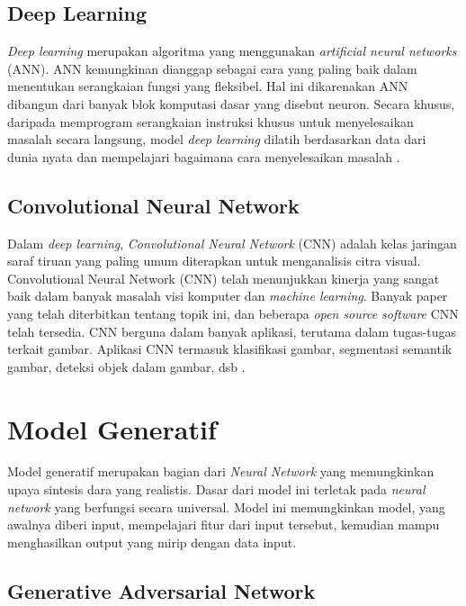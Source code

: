 \subsection{Deep Learning}
\label{subsesc:deeplearning}
\emph{Deep learning} merupakan algoritma yang menggunakan \emph{artificial neural networks} (ANN). 
ANN kemungkinan dianggap sebagai cara yang paling baik dalam menentukan serangkaian fungsi yang fleksibel. 
Hal ini dikarenakan ANN dibangun dari banyak blok komputasi dasar yang disebut neuron. 
Secara khusus, daripada memprogram serangkaian instruksi khusus untuk menyelesaikan masalah secara langsung, model \emph{deep learning} dilatih berdasarkan data dari dunia nyata dan mempelajari bagaimana cara menyelesaikan masalah \parencite{PDLT-2022}. 

\subsection{Convolutional Neural Network}
\label{subsec:convolutionalNeuralNetwork}

Dalam \emph{deep learning}, \emph{Convolutional Neural Network} (CNN) adalah kelas jaringan saraf tiruan yang paling umum diterapkan untuk menganalisis citra visual. 
Convolutional Neural Network (CNN) telah menunjukkan kinerja yang sangat baik dalam banyak masalah visi komputer dan \emph{machine learning}. 
Banyak paper yang telah diterbitkan tentang topik ini, dan beberapa \emph{open source software} CNN telah tersedia. 
CNN berguna dalam banyak aplikasi, terutama dalam tugas-tugas terkait gambar. 
Aplikasi CNN termasuk klasifikasi gambar, segmentasi semantik gambar, deteksi objek dalam gambar, dsb \parencite{introductionCNN}. 

\section{Model Generatif}
\label{sec:modelGeneratif}

Model generatif merupakan bagian dari \emph{Neural Network} yang memungkinkan upaya sintesis dara yang realistis. 
Dasar dari model ini terletak pada \emph{neural network} yang berfungsi secara universal. 
Model ini memungkinkan model, yang awalnya diberi input, mempelajari fitur dari input tersebut, kemudian mampu menghasilkan output yang mirip dengan data input.

\subsection{Generative Adversarial Network}
\label{subsec:generativeAdversarialNetwork}


